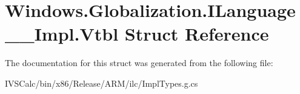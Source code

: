 \hypertarget{struct_windows_1_1_globalization_1_1_i_language_____impl_1_1_vtbl}{}\section{Windows.\+Globalization.\+I\+Language\+\_\+\+\_\+\+Impl.\+Vtbl Struct Reference}
\label{struct_windows_1_1_globalization_1_1_i_language_____impl_1_1_vtbl}


The documentation for this struct was generated from the following file\+:\begin{DoxyCompactItemize}
\item 
I\+V\+S\+Calc/bin/x86/\+Release/\+A\+R\+M/ilc/Impl\+Types.\+g.\+cs\end{DoxyCompactItemize}
